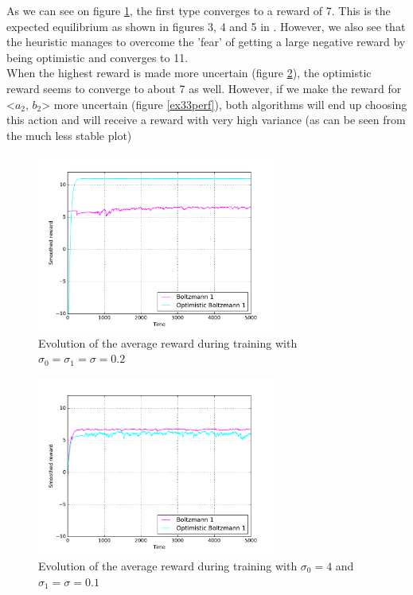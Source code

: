 \documentclass[a4paper]{article}
\begin{document}
As we can see on figure \ref{ex31perf}, the first type converges
to a reward of 7. This is the expected equilibrium as shown in figures 3, 4 and
5 in \cite{claus}. However, we also see that the heuristic manages to overcome
the 'fear' of getting a large negative reward by being optimistic and 
converges to 11.\\

When the highest reward is made more uncertain (figure \ref{ex32perf}), 
the optimistic reward seems to converge to about 7 as well. However, if we 
make the reward for <$a_2$, $b_2$> more uncertain (figure \ref{ex33perf}), 
both algorithms will end up choosing this action
and will receive a reward with very high variance (as can be seen from the
much less stable plot)\\


\begin{figure}[H]
	\centering
	\includegraphics[width=0.7\textwidth]{./fig/ex2-0.pdf}
	\caption{Evolution of the average reward during training with 
		$\sigma_0 = \sigma_1 = \sigma = 0.2$}
	\label{ex31perf}
\end{figure}
\begin{figure}[H]
	\centering
	\includegraphics[width=0.7\textwidth]{./fig/ex2-1.pdf}
	\caption{Evolution of the average reward during training with
		$\sigma_0 = 4$ and $\sigma_1 = \sigma = 0.1$}
	\label{ex32perf}
\end{figure}
\end{document}
